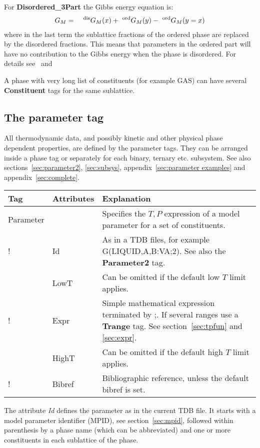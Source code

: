 \documentclass{article}
\begin{document}
For {\bf Disordered\_3Part} the Gibbs energy equation is:
\begin{eqnarray}
G_M &=& ~^{\rm dis}G_M(x) + ~^{\rm ord}G_M(y) - ~^{\rm ord}G_M(y=x) \label{eq:sub}
\end{eqnarray}
where in the last term the sublattice fractions of the ordered phase
are replaced by the disordered fractions.  This means that parameters
in the ordered part will have no contribution to the Gibbs energy when
the phase is disordered.  For details see~\cite{97Ans} and~\cite{07Hal}

A phase with very long list of constituents (for example GAS) can have
several {\bf Constituent} tags for the same sublattice.

\subsection{The parameter tag}\label{sec:parametertag}

All thermodynamic data, and possibly kinetic and other physical phase
dependent properties, are defined by the parameter tags.  They can be
arranged inside a phase tag or separately for each binary, ternary
etc. subsystem.  See also sections~\ref{sec:parameter2},
\ref{sec:subsys}, appendix~\ref{sec:parameter examples} and
appendix~\ref{sec:complete}.

\bigskip
\begin{tabular}{|p{} p{} p{}|}\hline
  Tag & Attributes & Explanation\\\hline

  Parameter & & Specifies the $T, P$ expression of a model parameter for a set of constituents.\\
!      & Id & As in a TDB files, for example G(LIQUID,A,B:VA;2).  See also the {\bf Parameter2} tag. \\
      & LowT & Can be omitted if the default low $T$ limit applies.\\
!      & Expr & Simple mathematical expression terminated by ;.  If several ranges use a {\bf Trange} tag.  See section~\ref{sec:tpfun} and \ref{sec:expr}.\\
      & HighT & Can be omitted if the default high $T$ limit applies.\\
!      & Bibref & Bibliographic reference, unless the default bibref is set.\\\hline
\end{tabular}

The attribute {\em Id} defines the parameter as in the current TDB
file.  It starts with a model parameter identifier (MPID), see
section~\ref{sec:mpid}, followed within parenthesis by a phase name
(which can be abbreviated) and one or more constituents in each
sublattice of the phase.
\end{document}
